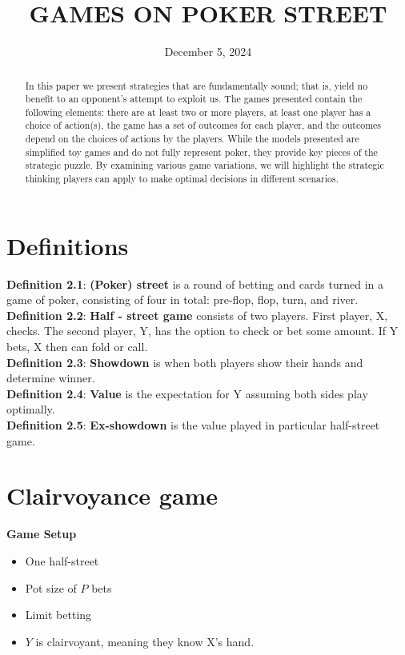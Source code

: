 \documentclass[12pt]{article}
\title{GAMES ON POKER STREET}
\date{December 5, 2024}
\begin{document}
\maketitle

\begin{abstract}

In this paper we present strategies that are fundamentally sound; that is, yield no benefit to an opponent's attempt to exploit us. The games presented contain the following elements: there are at least two or more players, at least one player has a choice of action(s), the game has a set of outcomes for each player, and the outcomes depend on the choices of actions by the players. While the models presented are simplified toy games and do not fully represent poker, they provide key pieces of the strategic puzzle. By examining various game variations, we will highlight the strategic thinking players can apply to make optimal decisions in different scenarios.

\end{abstract}

\section{Definitions}

\textbf{Definition 2.1}: \textbf{(Poker) street} is a round of betting and cards turned in a game of poker, consisting of four in total: pre-flop, flop, turn, and river.
\\
\textbf{Definition 2.2}: \textbf{Half - street game} consists of two players. First player, X, checks. The second player, Y, has the option to check or bet some amount. If Y bets, X then can fold or call.
\\
\textbf{Definition 2.3}: \textbf{Showdown} is when both players show their hands and determine winner. 
\\
\textbf{Definition 2.4}: \textbf{Value} is the expectation for Y assuming both sides play optimally.
\\
\textbf{Definition 2.5}: \textbf{Ex-showdown} is the value played in particular half-street game.
\pagebreak
\section{Clairvoyance game}

\textbf{Game Setup}
\begin{itemize}
    \item One half-street
    \item Pot size of $P$ bets
    \item Limit betting
    \item $Y$ is clairvoyant, meaning they know X's hand.
\end{itemize}
\end{document}
